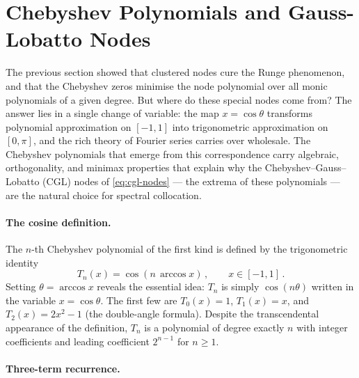 \section{Chebyshev Polynomials and Gauss-Lobatto Nodes}
\label{sec:spec-chebyshev}

The previous section showed that clustered nodes cure the Runge
phenomenon, and that the Chebyshev zeros minimise the node polynomial
over all monic polynomials of a given degree.  But where do these
special nodes come from?  The answer lies in a single change of
variable: the map $x = \cos\theta$ transforms polynomial
approximation on $[-1, 1]$ into trigonometric approximation on
$[0, \pi]$, and the rich theory of Fourier series carries over
wholesale.  The Chebyshev polynomials that emerge from this
correspondence carry algebraic, orthogonality, and minimax properties
that explain why the Chebyshev--Gauss--Lobatto (CGL) nodes of
\cref{eq:cgl-nodes} --- the extrema of these polynomials --- are the
natural choice for spectral collocation.

\paragraph{The cosine definition.}

The $n$-th Chebyshev polynomial of the first kind is defined by the
trigonometric identity
%
\begin{equation}
  T_n(x) = \cos(n\,\arccos x) \,,
  \qquad x \in [-1, 1] \,.
  \label{eq:chebyshev-def}
\end{equation}
%
Setting $\theta = \arccos x$ reveals the essential idea: $T_n$ is
simply $\cos(n\theta)$ written in the variable
$x = \cos\theta$.  The first few are $T_0(x) = 1$,
$T_1(x) = x$, and $T_2(x) = 2x^2 - 1$ (the double-angle
formula).  Despite the transcendental appearance of the definition,
$T_n$ is a polynomial of degree exactly $n$ with integer
coefficients and leading coefficient $2^{n-1}$ for $n \geq 1$.

\paragraph{Three-term recurrence.}

